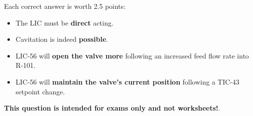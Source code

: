 





Each correct answer is worth 2.5 points:

\begin{itemize}
\item{} The LIC must be {\bf direct} acting.
\vskip 10pt
\item{} Cavitation is indeed {\bf possible}.
\vskip 10pt
\item{} LIC-56 will {\bf open the valve more} following an increased feed flow rate into R-101.
\vskip 10pt
\item{} LIC-56 will {\bf maintain the valve's current position} following a TIC-43 setpoint change.
\end{itemize}








{\bf This question is intended for exams only and not worksheets!}.


